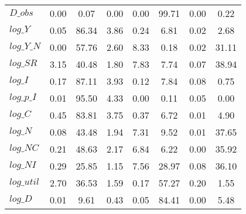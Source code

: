 \begin{center}
\begin{longtable}{lccccccc}
$D\_obs     $	 & 	        0.00	 & 	        0.07	 & 	        0.00	 & 	        0.00	 & 	       99.71	 & 	        0.00	 & 	        0.22 \\ 
$log\_Y     $	 & 	        0.05	 & 	       86.34	 & 	        3.86	 & 	        0.24	 & 	        6.81	 & 	        0.02	 & 	        2.68 \\ 
$log\_Y\_N  $	 & 	        0.00	 & 	       57.76	 & 	        2.60	 & 	        8.33	 & 	        0.18	 & 	        0.02	 & 	       31.11 \\ 
$log\_SR    $	 & 	        3.15	 & 	       40.48	 & 	        1.80	 & 	        7.83	 & 	        7.74	 & 	        0.07	 & 	       38.94 \\ 
$log\_I     $	 & 	        0.17	 & 	       87.11	 & 	        3.93	 & 	        0.12	 & 	        7.84	 & 	        0.08	 & 	        0.75 \\ 
$log\_p\_I  $	 & 	        0.01	 & 	       95.50	 & 	        4.33	 & 	        0.00	 & 	        0.11	 & 	        0.05	 & 	        0.00 \\ 
$log\_C     $	 & 	        0.45	 & 	       83.81	 & 	        3.75	 & 	        0.37	 & 	        6.72	 & 	        0.01	 & 	        4.90 \\ 
$log\_N     $	 & 	        0.08	 & 	       43.48	 & 	        1.94	 & 	        7.31	 & 	        9.52	 & 	        0.01	 & 	       37.65 \\ 
$log\_NC    $	 & 	        0.21	 & 	       48.63	 & 	        2.17	 & 	        6.84	 & 	        6.22	 & 	        0.00	 & 	       35.92 \\ 
$log\_NI    $	 & 	        0.29	 & 	       25.85	 & 	        1.15	 & 	        7.56	 & 	       28.97	 & 	        0.08	 & 	       36.10 \\ 
$log\_util  $	 & 	        2.70	 & 	       36.53	 & 	        1.59	 & 	        0.17	 & 	       57.27	 & 	        0.20	 & 	        1.55 \\ 
$log\_D     $	 & 	        0.01	 & 	        9.61	 & 	        0.43	 & 	        0.05	 & 	       84.41	 & 	        0.00	 & 	        5.48 \\ 
\end{longtable}
 \end{center}
